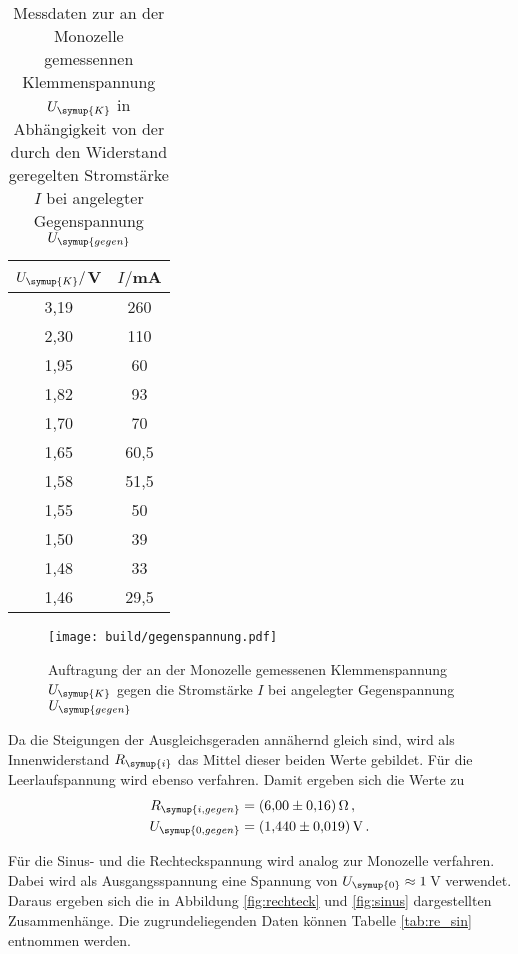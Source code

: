 \begin{table}
  \centering
  \caption{Messdaten zur an der Monozelle gemessennen Klemmenspannung $U_{\symup{K}}$
  in Abhängigkeit von der durch den Widerstand geregelten Stromstärke $I$ bei angelegter
  Gegenspannung $U_{\symup{gegen}}$}
  \label{tab:gegenspannung}
  \begin{tabular}{c c}
    \toprule
    $U_{\symup{K}}/$V & $I/$mA\\
    \midrule
    3,19	&  260\\
    2,30	&  110\\
    1,95	&  60\\
    1,82	&  93\\
    1,70	&  70\\
    1,65	&  60,5\\
    1,58	&  51,5\\
    1,55	&  50\\
    1,50	&  39\\
    1,48	&  33\\
    1,46	&  29,5\\
    \bottomrule
  \end{tabular}
\end{table}

\begin{figure}
  \centering
  \texttt{[image: build/gegenspannung.pdf]}
  \caption{Auftragung der an der Monozelle gemessenen Klemmenspannung $U_{\symup{K}}$
  gegen die Stromstärke $I$ bei angelegter Gegenspannung $U_{\symup{gegen}}$ }
  \label{fig:gegenspannung}
\end{figure}

Da die Steigungen der Ausgleichsgeraden annähernd gleich sind, wird als Innenwiderstand $R_{\symup{i}}$
das Mittel dieser beiden Werte gebildet. Für die Leerlaufspannung wird ebenso verfahren.
Damit ergeben sich die Werte zu
\begin{align}
  R_{\symup{i,gegen}} &= \SI{6.00(016)}{\ohm} \,,\\
  U_{\symup{0,gegen}} &= \SI{1.440(0019)}{\volt} \,.
\end{align}

Für die Sinus- und die Rechteckspannung wird analog zur Monozelle verfahren. Dabei
wird als Ausgangsspannung eine Spannung von $U_{\symup{0}}\approx1$\,V verwendet.
Daraus ergeben sich die in Abbildung \ref{fig:rechteck} und \ref{fig:sinus} dargestellten
Zusammenhänge. Die zugrundeliegenden Daten können Tabelle \ref{tab:re_sin} entnommen
werden.

